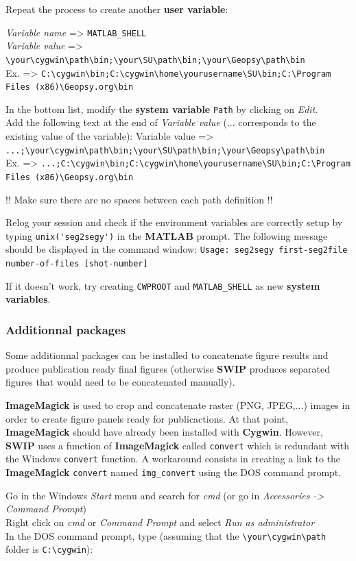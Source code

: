 \documentclass[twoside,a4paper]{article}
\def\SWIP{\textbf{SWIP}}
\def\SU{\textbf{SU}}
\def\Geopsy{\textbf{Geospy}}
\def\ImageMagick{\textbf{ImageMagick}}
\def\MATLAB{\textbf{MATLAB}}
\def\Cygwin{\textbf{Cygwin}}
\begin{document}
Repeat the process to create another \textbf{user variable}:

\textit{Variable name} => \verb|MATLAB_SHELL|\\
\textit{Variable value} => \verb|\your\cygwin\path\bin;\your\SU\path\bin;\your\Geopsy\path\bin|\\
Ex. => \verb|C:\cygwin\bin;C:\cygwin\home\yourusername\SU\bin;C:\Program Files (x86)\Geopsy.org\bin|

In the bottom list, modify the \textbf{system variable} \verb|Path| by clicking on \textit{Edit}.\\
Add the following text at the end of \textit{Variable value} (... corresponds to the existing value of the variable):
Variable value => \verb|...;\your\cygwin\path\bin;\your\SU\path\bin;\your\Geopsy\path\bin|\\
Ex. => \verb|...;C:\cygwin\bin;C:\cygwin\home\yourusername\SU\bin;C:\Program Files (x86)\Geopsy.org\bin|

!! Make sure there are no spaces between each path definition !!

Relog your session and check if the environment variables are correctly setup by typing \verb|unix('seg2segy')| in the {\MATLAB} prompt. The following message should be displayed in the command window: \verb|Usage: seg2segy first-seg2file number-of-files [shot-number]|

If it doesn't work, try creating \verb|CWPROOT| and \verb|MATLAB_SHELL| as new \textbf{system variables}.

\subsubsection{Additionnal packages}
\label{subsec:WinExtra}
Some additionnal packages can be installed to concatenate figure results and produce publication ready final figures (otherwise {\SWIP} produces separated figures that would need to be concatenated manually).

{\ImageMagick} is used to crop and concatenate raster (PNG, JPEG,...) images in order to create figure panels ready for publicactions. At that point, {\ImageMagick} should have already been installed with {\Cygwin}. However, {\SWIP} uses a function of {\ImageMagick} called \verb|convert| which is redundant with the Windows \verb|convert| function. A workaround consists in creating a link to the {\ImageMagick} \verb|convert| named \verb|img_convert| using the DOS command prompt.

Go in the Windows \textit{Start} menu and search for \textit{cmd} (or go in \textit{Accessories -> Command Prompt})\\
Right click on \textit{cmd} or \textit{Command Prompt} and select \textit{Run as administrator}\\
In the DOS command prompt, type (assuming that the \verb|\your\cygwin\path| folder is \verb|C:\cygwin|):
\end{document}
